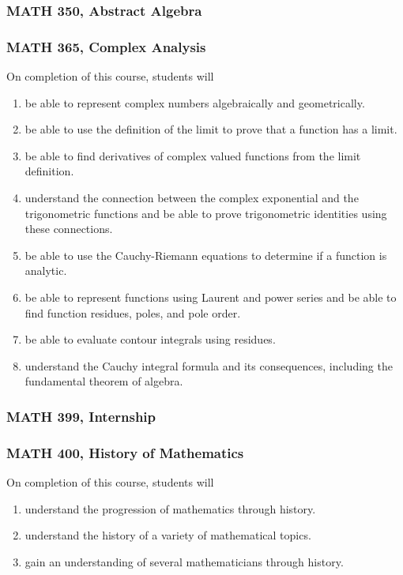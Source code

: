 \documentclass[10pt]{article}
\newenvironment{alphalist}{
\begin{enumerate}[label=(\arabic*),widest=107 ,leftmargin=25pt, itemsep=0pt]}
{\end{enumerate}}
\begin{document}
\subsubsection*{MATH 350,  Abstract Algebra}

\subsubsection*{MATH 365, Complex Analysis}

On completion of this course, students will 
\begin{alphalist}
    \item be able to represent complex numbers algebraically and geometrically.
    \item be able to use the definition of the limit to prove that a function has a limit.
    \item be able to find derivatives of complex valued functions from the limit definition.
    \item understand the connection between the complex exponential and the trigonometric functions and be able to 
        prove trigonometric identities using these connections.
    \item be able to use the Cauchy-Riemann equations to determine if a function is 
          analytic.
    \item be able to represent functions using Laurent and power series and be able 
           to find function residues, poles, and pole order.
    \item be able to evaluate contour integrals using residues.
    \item understand the Cauchy integral formula and its consequences,  including the 
       fundamental theorem of algebra.
\end{alphalist}





\subsubsection*{MATH 399, Internship}


\subsubsection*{MATH 400, History of Mathematics}

On completion of this course, students will 
\begin{alphalist}
    \item understand the progression of mathematics through history.
    \item understand the history of a variety of mathematical topics.
    \item gain an understanding of several mathematicians through history.
\end{alphalist}
\end{document}

